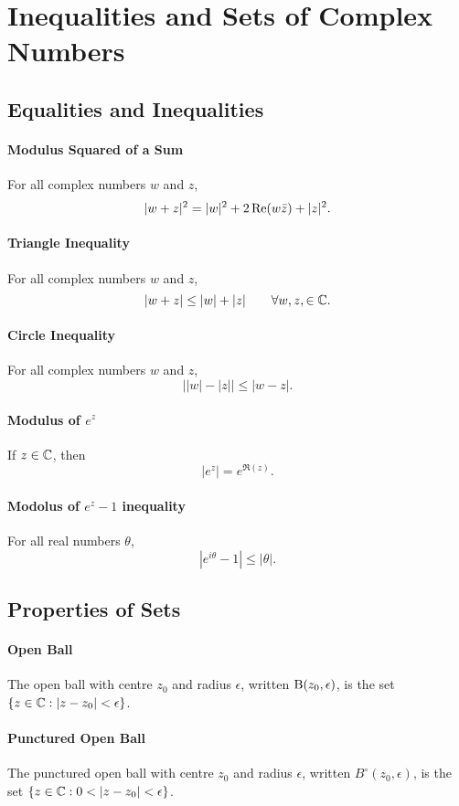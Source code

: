 \section{Inequalities and Sets of Complex Numbers}
\subsection{Equalities and Inequalities}
\paragraph{Modulus Squared of a Sum}
For all complex numbers \(w\) and \(z\),
\[|w + z| ^2 = |w|^2 + 2\Re(w\bar{z}) + |z|^2.\]

\paragraph{Triangle Inequality}
For all complex numbers \(w\) and \(z\),
\[|w + z| \leq |w| + |z| \qquad \forall w,z, \in \mathbb{C}.\]

\paragraph{Circle Inequality}
For all complex numbers \(w\) and \(z\),
\[\left||w| - |z|\right| \leq |w - z|.\]

\paragraph{Modulus of \(e^z\)}
If \(z \in \mathbb{C}\), then
\[|e^z| = e^{\Re(z)}.\]

\paragraph{Modolus of \(e^z - 1\) inequality}
For all real numbers \(\theta\),
\[|e^{i\theta} - 1 | \leq |\theta|.\]

\subsection{Properties of Sets}
\paragraph{Open Ball}
The open ball with centre \(z_0\) and radius \(\epsilon\), written \(\mathrm{B}(z_0, \epsilon)\), is the set \(\{z \in \mathbb{C}: |z - z_0| < \epsilon\}\).

\paragraph{Punctured Open Ball}
The punctured open ball with centre \(z_0\) and radius \(\epsilon\), written \(B^\circ(z_0, \epsilon)\), is the set \(\{z \in \mathbb{C} : 0 < |z - z_0 | < \epsilon\}\).

